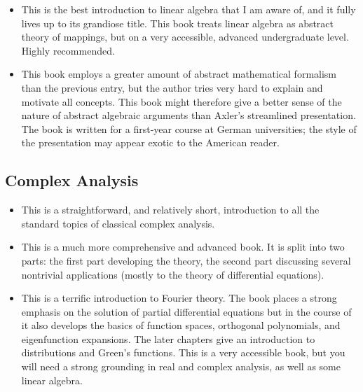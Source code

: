 \begin{itemize}
\item {}
  This is the best introduction to linear algebra that I am aware of,
  and it fully lives up to its grandiose title. This book treats
  linear algebra as abstract theory of mappings, but on a very
  accessible, advanced undergraduate level. Highly recommended.

\item {}
  This book employs a greater amount of abstract mathematical
  formalism than the previous entry, but the author tries very hard to
  explain and motivate all concepts. This book might therefore give a
  better sense of the nature of abstract algebraic arguments than
  Axler's streamlined presentation. The book is written for a 
first-year course at German universities; the style of the presentation
  may appear exotic to the American reader.
\end{itemize}
 

\subsection{Complex Analysis}


\begin{itemize}
\item {}
  This is a straightforward, and relatively short, introduction to all
  the standard topics of classical complex analysis. 

\item {}
  This is a much more comprehensive and advanced book. It is split into
  two parts: the first part developing the theory, the second part
  discussing several nontrivial applications (mostly to the theory of
  differential equations).

\item {}
  This is a terrific introduction to Fourier theory. The book places a
  strong emphasis on the solution of partial differential equations
  but in the course of it also develops the basics of function spaces,
  orthogonal polynomials, and eigenfunction expansions. The later
  chapters give an introduction to distributions and Green's
  functions.  This is a very accessible book, but you will need a
  strong grounding in real and complex analysis, as well as some
  linear algebra.
\end{itemize}

